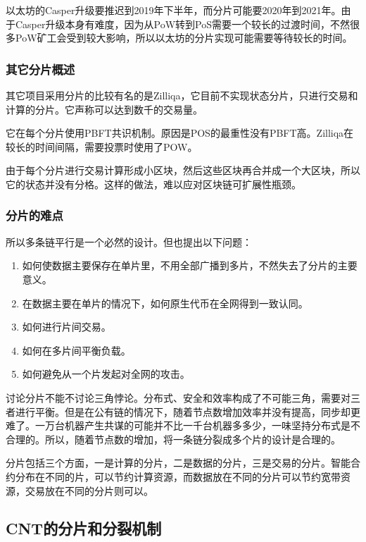 \documentclass[a4paper,12pt]{article}
\begin{document}
以太坊的Casper升级要推迟到2019年下半年，而分片可能要2020年到2021年。由于Casper升级本身有难度，因为从PoW转到PoS需要一个较长的过渡时间，不然很多PoW矿工会受到较大影响，所以以太坊的分片实现可能需要等待较长的时间。

\subsubsection{其它分片概述}
其它项目采用分片的比较有名的是Zilliqa，它目前不实现状态分片，只进行交易和计算的分片。它声称可以达到数千的交易量。

它在每个分片使用PBFT共识机制。原因是POS的最重性没有PBFT高。Zilliqa在较长的时间间隔，需要投票时使用了POW。%

由于每个分片进行交易计算形成小区块，然后这些区块再合并成一个大区块，所以它的状态并没有分格。这样的做法，难以应对区块链可扩展性瓶颈。

\subsubsection{分片的难点}

所以多条链平行是一个必然的设计。但也提出以下问题：

\begin{enumerate}
\item 如何使数据主要保存在单片里，不用全部广播到多片，不然失去了分片的主要意义。
\item 在数据主要在单片的情况下，如何原生代币在全网得到一致认同。
\item 如何进行片间交易。
\item 如何在多片间平衡负载。
\item 如何避免从一个片发起对全网的攻击。
\end{enumerate}

讨论分片不能不讨论三角悖论。分布式、安全和效率构成了不可能三角，需要对三者进行平衡。但是在公有链的情况下，随着节点数增加效率并没有提高，同步却更难了。一万台机器产生共谋的可能并不比一千台机器多多少，一味坚持分布式是不合理的。所以，随着节点数的增加，将一条链分裂成多个片的设计是合理的。

分片包括三个方面，一是计算的分片，二是数据的分片，三是交易的分片。智能合约分布在不同的片，可以节约计算资源，而数据放在不同的分片可以节约宽带资源，交易放在不同的分片则可以。

\subsection{CNT的分片和分裂机制}
\end{document}
